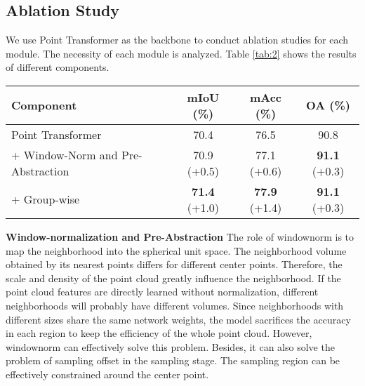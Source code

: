 \documentclass[10pt,twocolumn,letterpaper]{article}
\begin{document}
    \subsection{Ablation Study}

        We use Point Transformer as the backbone to conduct ablation studies for each module. The necessity of each module is analyzed. Table \ref{tab:2} shows the results of different components.

        \begin{table*}[!htb]\centering

            \renewcommand\arraystretch{1.2}
        \caption{Ablation studies: Different components.}
        \begin{tabular}{l|ccc}
        \toprule
        Component                           & mIoU (\%)        & mAcc (\%)       & OA (\%)       \\ \hline
        Point Transformer                    & 70.4        & 76.5        & 90.8        \\
        + Window-Norm   and Pre-Abstraction & 70.9 (+0.5) & 77.1 (+0.6) & \textbf{91.1} (+0.3) \\
        + Group-wise                        & \textbf{71.4} (+1.0) & \textbf{77.9} (+1.4) & \textbf{91.1} (+0.3) \\
        \bottomrule
        \end{tabular}
        \label{tab:2}
        \end{table*}

        \textbf{Window-normalization and Pre-Abstraction}  The role of windownorm is to map the neighborhood into the spherical unit space. The neighborhood volume obtained by its  nearest points differs for different center points. Therefore, the scale and density of the point cloud greatly influence the neighborhood. If the point cloud features are directly learned without normalization, different neighborhoods will probably have different volumes. Since neighborhoods with different sizes share the same network weights, the model sacrifices the accuracy in each region to keep the efficiency of the whole point cloud. However, windownorm can effectively solve this problem. Besides, it can also solve the problem of sampling offset in the sampling stage. The sampling region can be effectively constrained around the center point.
\end{document}
